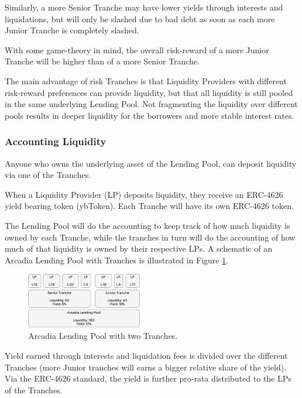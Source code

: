 \documentclass[sigconf,nonacm]{acmart}
\begin{document}
Similarly, a more Senior Tranche may have lower yields through interests and liquidations,
but will only be slashed due to bad debt as soon as each more Junior Tranche is completely slashed.

With some game-theory in mind, the overall risk-reward of a more Junior Tranche will be higher than of a more Senior Tranche.

The main advantage of risk Tranches is that Liquidity Providers with different risk-reward preferences can provide liquidity,
but that all liquidity is still pooled in the same underlying Lending Pool.
Not fragmenting the liquidity over different pools results in deeper liquidity for the borrowers and more stable interest rates.

\subsubsection{Accounting Liquidity}
\label{subsubsec:accounting-liquidity}
Anyone who owns the underlying asset of the Lending Pool, can deposit liquidity via one of the Tranches.

When a Liquidity Provider (LP) deposits liquidity, they receive an ERC-4626 yield bearing token (ybToken).
Each Tranche will have its own ERC-4626 token.

The Lending Pool will do the accounting to keep track of how much liquidity is owned by each Tranche,
while the tranches in turn will do the accounting of how much of that liquidity is owned by their respective LPs.
A schematic of an Arcadia Lending Pool with Tranches is illustrated in Figure \ref{fig:tranches}.

\begin{figure}
    \centering
    \includegraphics[width=0.45\textwidth]{images/Tranches.png}
    \caption{Arcadia Lending Pool with two Tranches. \label{fig:tranches}}
\end{figure}

Yield earned through interests and liquidation fees is divided over the different Tranches
(more Junior tranches will earns a bigger relative share of the yield).
Via the ERC-4626 standard, the yield is further pro-rata distributed to the LPs of the Tranches.
\end{document}
